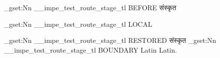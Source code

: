 \documentclass{article}
\begin{document}
\ExplSyntaxOn\tl_gset:Nn \g__impe_test_route_stage_tl {BEFORE}\ExplSyntaxOff
संस्कृत

\ExplSyntaxOn\tl_gset:Nn \g__impe_test_route_stage_tl {LOCAL}\ExplSyntaxOff
{}

\ExplSyntaxOn\tl_gset:Nn \g__impe_test_route_stage_tl {RESTORED}\ExplSyntaxOff
संस्कृत
\ExplSyntaxOn\tl_gset:Nn \g__impe_test_route_stage_tl {BOUNDARY}\ExplSyntaxOff
Latin  Latin.
\end{document}
